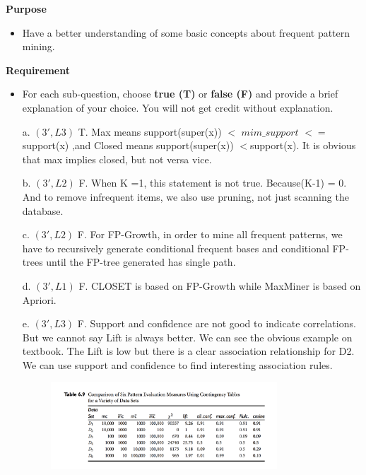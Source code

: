 \textbf{Purpose}
\begin{itemize}
\item Have a better understanding of some basic concepts about frequent pattern mining.
\end{itemize}

\textbf{Requirement}
\begin{itemize}
\item For each sub-question, choose \textbf{true (T)} or \textbf{false (F)} and provide a brief explanation of your choice. You will not get credit without explanation. 
\end{itemize}

\begin{enumerate}
  \item[a.] $(3', L3)$ T. Max means support(super(x)) $<$ $mim\_support$ $<= $support(x) ,and Closed means support(super(x)) $< $support(x). It is obvious that max implies closed, but not versa vice. 
  \item[b.] $(3', L2)$ F. When K =1, this statement is not true. Because(K-1) = 0. And to remove infrequent items, we also use pruning, not just scanning the database.
   \item[c.] $(3', L2)$ F. For FP-Growth, in order to mine all frequent patterns, we have to recursively generate conditional frequent bases and conditional FP-trees until the FP-tree generated has single path.
 \item[d.] $(3', L1)$ F. CLOSET is based on FP-Growth while MaxMiner is based on Apriori.
 \item[e.] $(3', L3)$ F. Support and confidence are not good to indicate correlations. But we cannot say Lift is always better. We can see the obvious example on textbook. The Lift is low but there is a clear association relationship for D2.  We can use support and confidence to find interesting association rules. 
     \begin{figure}[H]
\includegraphics[width=0.8\textwidth]{Figures/lift.png}
\centering
\end{figure}
 
\end{enumerate}



